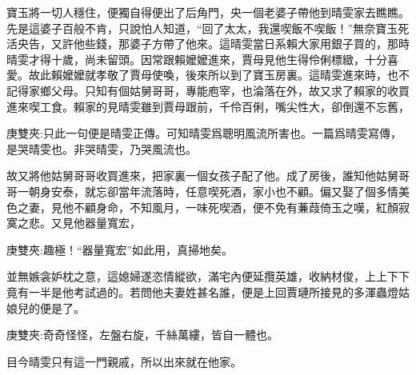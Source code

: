 \begin{parag}
    寶玉將一切人穩住，便獨自得便出了后角門，央一個老婆子帶他到晴雯家去瞧瞧。先是這婆子百般不肯，只說怕人知道，“回了太太，我還喫飯不喫飯！”無奈寶玉死活央告，又許他些錢，那婆子方帶了他來。這晴雯當日系賴大家用銀子買的，那時晴雯才得十歲，尚未留頭。因常跟賴嬤嬤進來，賈母見他生得伶俐標緻，十分喜愛。故此賴嬤嬤就孝敬了賈母使喚，後來所以到了寶玉房裏。這晴雯進來時，也不記得家鄉父母。只知有個姑舅哥哥，專能庖宰，也淪落在外，故又求了賴家的收買進來喫工食。賴家的見晴雯雖到賈母跟前，千伶百俐，嘴尖性大，卻倒還不忘舊，\begin{note}庚雙夾:只此一句便是晴雯正傳。可知晴雯爲聰明風流所害也。一篇爲晴雯寫傳，是哭晴雯也。非哭晴雯，乃哭風流也。\end{note}故又將他姑舅哥哥收買進來，把家裏一個女孩子配了他。成了房後，誰知他姑舅哥哥一朝身安泰，就忘卻當年流落時，任意喫死酒，家小也不顧。偏又娶了個多情美色之妻，見他不顧身命，不知風月，一味死喫酒，便不免有蒹葭倚玉之嘆，紅顏寂寞之悲。又見他器量寬宏，\begin{note}庚雙夾:趣極！“器量寬宏”如此用，真掃地矣。\end{note}並無嫉衾妒枕之意，這媳婦遂恣情縱欲，滿宅內便延攬英雄，收納材俊，上上下下竟有一半是他考試過的。若問他夫妻姓甚名誰，便是上回賈璉所接見的多渾蟲燈姑娘兒的便是了。\begin{note}庚雙夾:奇奇怪怪，左盤右旋，千絲萬縷，皆自一體也。\end{note}目今晴雯只有這一門親戚，所以出來就在他家。
\end{parag}


